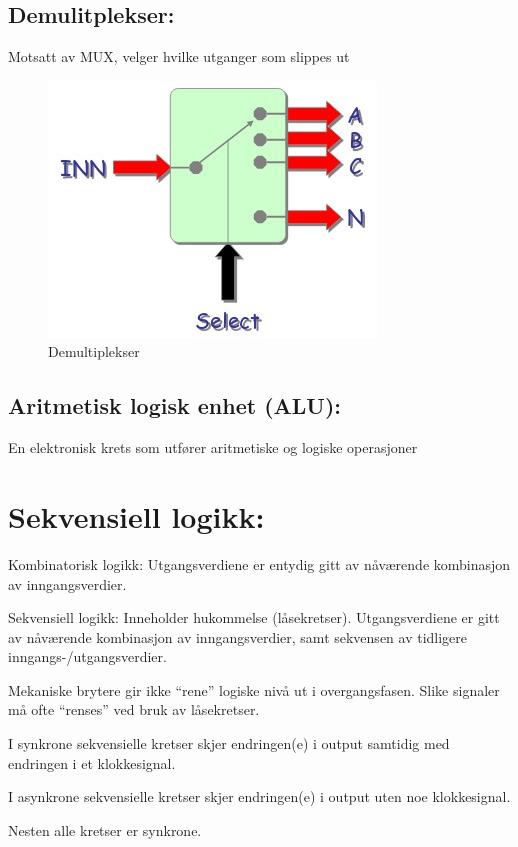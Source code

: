 \documentclass{article}
\begin{document}
	
	\subsection*{Demulitplekser:}
	Motsatt av MUX, velger hvilke utganger som slippes ut
	
	\begin{figure}[H]
		\includegraphics[scale = 0.6]{DEMUX.jpg}
		\caption{Demultiplekser}
	\end{figure}
	
	
	\subsection*{Aritmetisk logisk enhet (ALU):}
	En elektronisk krets som utfører aritmetiske og logiske operasjoner	
	
	\section*{Sekvensiell logikk:}
	
	Kombinatorisk logikk:
	Utgangsverdiene er entydig gitt av nåværende kombinasjon av inngangsverdier.
	
	Sekvensiell logikk:
	Inneholder hukommelse (låsekretser). Utgangsverdiene er gitt av nåværende kombinasjon av inngangsverdier,  samt sekvensen av tidligere inngangs-­/utgangsverdier.
	
	Mekaniske brytere gir ikke “rene”  logiske nivå ut i
	overgangsfasen.  Slike signaler  må ofte “renses”  ved bruk
	av låsekretser.
	
	I synkrone  sekvensielle kretser skjer endringen(e) i output  samtidig  med endringen i et  klokkesignal. 
	 
	I  asynkrone  sekvensielle kretser skjer endringen(e) i  output  uten  noe  klokkesignal.  
	 
	Nesten alle kretser er synkrone.
	 
\end{document}
